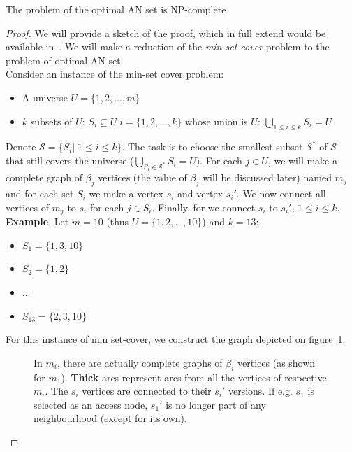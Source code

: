 \documentclass{svk_long_en}
\newcommand{\inputTikZ}[1]{%
    \beginpgfgraphicnamed{#1-external}%
    \endpgfgraphicnamed%
}
\begin{document}
		\begin{theorem}
			The problem of the optimal AN set is NP-complete
		\end{theorem}
		\begin{proof}
			We will provide a sketch of the proof, which in full extend would be available in~\cite{dottg13}. We will make a reduction of the \textit{min-set cover} problem to the problem of optimal AN set. \\
			
			\noindent Consider an instance of the min-set cover problem:
			\begin{itemize}
				\item A universe $U = \{1, 2, ..., m\}$
				\item $k$ subsets of $U$: $S_{i} \subseteq U \; i = \{1, 2, ..., k\}$ whose union is $U$: $\bigcup\limits_{1 \leq i \leq k} S_{i} = U$
			\end{itemize}
			\hspace*{\fill}
			
			\noindent Denote $\mathcal{S} = \{S_{i}| \; 1 \leq i \leq k\}$. The task is to choose the smallest subset $\mathcal{S}^{*}$ of $\mathcal{S}$ that still covers the universe ($\bigcup\limits_{S_{i} \in \mathcal{S}^{*}} S_{i} = U$). For each $j \in U$, we will make a complete graph of $\beta_{j}$ vertices (the value of $\beta_{j}$ will be discussed later) named $m_{j}$ and for each set $S_{i}$ we make a vertex $s_{i}$ and vertex $s_{i}'$. We now connect all vertices of $m_{j}$ to $s_{i}$ for each $j \in S_{i}$. Finally, for we connect $s_{i}$ to $s_{i}'$, $1 \leq i \leq k$. \\
			 
			\noindent \textbf{Example}. Let $m = 10$ (thus $U = \{1, 2, ..., 10\}$) and $k = 13$:
			\begin{itemize}
				\item $S_{1} = \{1, 3, 10\}$
			 	\item $S_{2} = \{1, 2\}$
			 	\item ...
			 	\item $S_{13} = \{2, 3, 10\}$
			\end{itemize}
			\hspace*{\fill}
			 
			\noindent For this instance of min set-cover, we construct the graph depicted on figure~\ref{fig:reduction}. \\
			 
			\begin{figure}[h!]
				\begin{center}
					\inputTikZ{./tikzpics/reduction}
				\end{center}
				\caption{\label{fig:reduction} In $m_{i}$, there are actually complete graphs of $\beta_{i}$ vertices (as shown for $m_{1}$). \textbf{Thick} arcs represent arcs from all the vertices of respective $m_{i}$. The $s_{i}$ vertices are connected to their $s_{i}'$ versions. If e.g. $s_{1}$ is selected as an access node, $s_{1}'$ is no longer part of any neighbourhood (except for its own).}
			\end{figure}
			

\end{proof}
\end{document}

